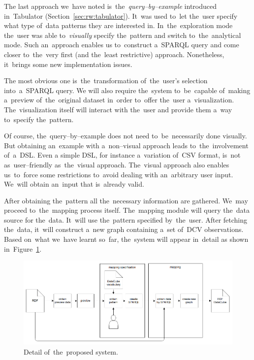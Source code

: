 The last approach we~have noted is~the~\emph{query--by--example} introduced in~Tabulator (Section~\ref{sec:rw:tabulator}). It~was used to~let the~user specify what type of~data patterns they are 
interested in. In~the~exploration mode the~user was able to~\emph{visually} 
specify the~pattern and switch to~the~analytical mode. Such an~approach enables 
us to~construct a~SPARQL query and come closer to~the~very first (and the~least restrictive) 
approach. Nonetheless, it~brings some new implementation issues.

The most obvious one is~the~transformation of~the~user's selection into~a~SPARQL query. 
We will also require the~system to~be~capable of~making a~preview of~the~original dataset in~order to~offer the~user a~visualization. The~visualization 
itself will interact with the~user and provide them a~way to~specify the~pattern.

Of course, the~query--by--example does not need to~be~necessarily done visually. But 
obtaining an~example with a~non--visual approach leads to~the~involvement of~a~DSL. Even 
a simple DSL, for instance a~variation of~CSV format, is~not as~user--friendly as~the~visual approach. The~visual approach also enables us~to~force some 
restrictions to~avoid dealing with an~arbitrary user input. We~will 
obtain an~input that is~already valid.

After obtaining the~pattern all the~necessary information are gathered. We~may proceed to~the~mapping process itself. The~mapping module will query the~data source for the~data. It~will use the~pattern specified by~the~user. After 
fetching the~data, it~will construct a~new graph containing a~set of~DCV 
observations. Based on~what we~have learnt so~far, the~system will appear in~detail 
as shown in~Figure~\ref{fig:generic-mapping-detail}.

\begin{figure}
	\centering
	\includegraphics[width=140mm]{img/generic-mapping-detail.png}
	\caption{Detail of~the~proposed system.}
	\label{fig:generic-mapping-detail}
\end{figure}


